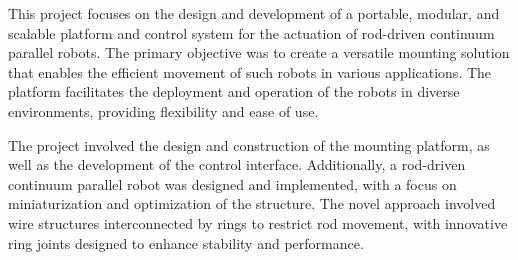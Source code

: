 
\par
This project focuses on the design and development of a portable, modular, and scalable platform and control system for the actuation of rod-driven continuum parallel robots. The primary objective was to create a versatile mounting solution that enables the efficient movement of such robots in various applications. The platform facilitates the deployment and operation of the robots in diverse environments, providing flexibility and ease of use.

\par
The project involved the design and construction of the mounting platform, as well as the development of the control interface. Additionally, a rod-driven continuum parallel robot was designed and implemented, with a focus on miniaturization and optimization of the structure. The novel approach involved wire structures interconnected by rings to restrict rod movement, with innovative ring joints designed to enhance stability and performance.